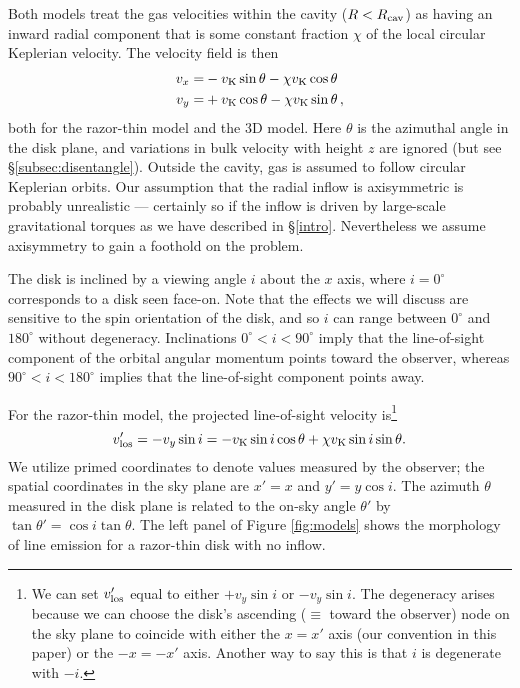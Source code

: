 Both models treat the gas velocities within the cavity ($R<R_{\rm cav}$) as 
having an inward radial component that is some constant fraction $\chi$ of the 
local circular Keplerian velocity.  The velocity field is then
\begin{align}
v_x =& -v_{\rm K} \sin\theta - \chi v_{\rm K} \cos \theta \\
v_y =& +v_{\rm K}  \cos\theta - \chi v_{\rm K} \sin \theta \,,
\end{align}
both for the razor-thin model and the 3D model.  Here $\theta$ is the azimuthal 
angle in the disk plane, and variations in bulk velocity with height $z$ are 
ignored (but see \S \ref{subsec:disentangle}).  Outside the cavity, gas is 
assumed to follow circular Keplerian orbits.  Our assumption that the radial 
inflow is axisymmetric is probably unrealistic --- certainly so if the inflow 
is driven by large-scale gravitational torques as we have described in 
\S\ref{intro}.  Nevertheless we assume axisymmetry to gain a foothold on the 
problem.

The disk is inclined by a viewing angle $i$ about the $x$ axis, where 
$i=0^\circ$ corresponds to a disk seen face-on.  Note that the effects we will 
discuss are sensitive to the spin orientation of the disk, and so $i$ can range 
between $0^\circ$ and $180^\circ$ without degeneracy.  Inclinations $0^\circ < i < 
90^\circ$ imply that the line-of-sight component of the orbital angular momentum 
points toward the observer, whereas $90^\circ < i < 180^\circ$ implies 
that the line-of-sight component points away.

For the razor-thin model, the projected line-of-sight velocity is\footnote{We 
can set $v'_{\rm los}$  equal to either $+ v_y \sin i$ or $- v_y \sin i$.  The 
degeneracy arises because we can choose the disk's ascending ($\equiv$ toward 
the observer) node on the sky plane to coincide with either the $x=x'$ axis 
(our convention in this paper) or the $-x = -x'$ axis.  Another way to say this 
is that $i$ is degenerate with $-i$.}
\begin{equation}
v'_{\rm los}= -v_y \sin i = -v_{\rm K}\sin i\cos\theta+\chi v_{\rm K} \sin i\sin\theta.
\label{eq:vlos}
\end{equation}
We utilize primed coordinates to denote values measured by the observer; the 
spatial coordinates in the sky plane are $x'=x$ and $y'=y\cos i$.  The azimuth 
$\theta$ measured in the disk plane is related to the on-sky angle $\theta'$ by 
$\tan\theta'= \cos i \tan \theta$.  The left panel of Figure \ref{fig:models} 
shows the morphology of line emission for a razor-thin disk with no inflow.

